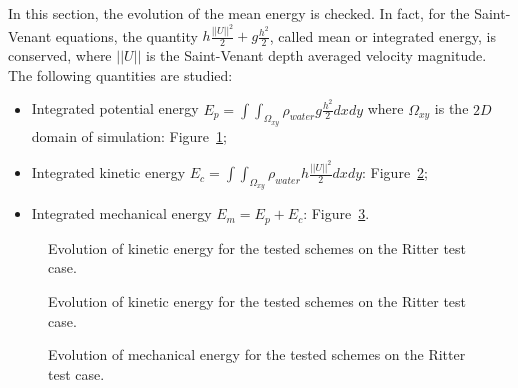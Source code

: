 In this section, the evolution of the mean energy is checked. In fact, for the Saint-Venant equations,
the quantity $h \frac{||U||^2}{2} + g \frac{h^2}{2}$, called mean or integrated energy, is conserved,
where $||U||$ is the Saint-Venant depth averaged velocity magnitude.
The following quantities are studied:
\begin{itemize}
\item Integrated potential energy \textbf{$E_p =\int\int_{\Omega_{xy}}\rho_{water} g \frac{h^2}{2} dxdy$} where $\Omega_{xy}$ is the $2D$ domain of simulation: Figure~\ref{fig:ritter:Ep};
\item Integrated kinetic energy \textbf{$E_c =\int\int_{\Omega_{xy}} \rho_{water} h \frac{||U||^2}{2} dxdy$}: Figure~\ref{fig:ritter:Ec};
\item Integrated mechanical energy \textbf{$E_m = E_p + E_c$}: Figure~\ref{fig:ritter:Em}.
\end{itemize}

\begin{figure}[H]
\centering
  \caption{Evolution of kinetic energy for the tested schemes on the Ritter test case.}
\label{fig:ritter:Ep}
\end{figure}

\begin{figure}[H]
\centering
  \caption{Evolution of kinetic energy for the tested schemes on the Ritter test case.}
\label{fig:ritter:Ec}
\end{figure}

\begin{figure}[H]
\centering
  \caption{Evolution of mechanical energy for the tested schemes on the Ritter test case.}
\label{fig:ritter:Em}
\end{figure}

\newpage


